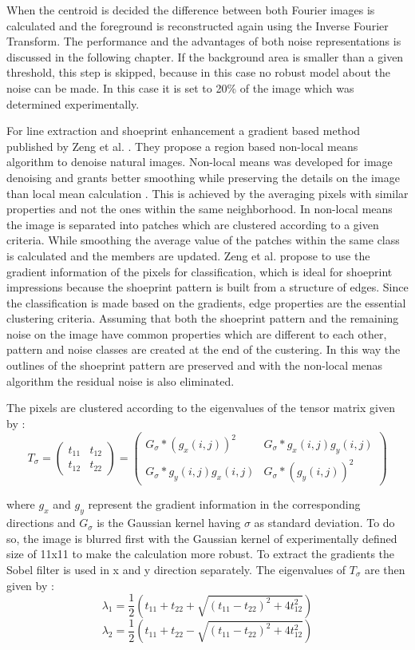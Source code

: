 \documentclass[draft,final]{vutinfth} %
\begin{document}
When the centroid is decided the difference between both Fourier images is calculated and the foreground is reconstructed again using the Inverse Fourier Transform.
The performance and the advantages of both noise representations is discussed in the following chapter.
If the background area is smaller than a given threshold, this step is skipped, because in this case no robust model about the noise can be made.
In this case it is set to 20\% of the image which was determined experimentally.
\par
For line extraction and shoeprint enhancement a gradient based method published by Zeng et al. \cite{zeng2011region}.
They propose a region based non-local means algorithm to denoise natural images.
Non-local means was developed for image denoising and grants better smoothing while preserving the details on the image than local mean calculation \cite{buades2005non}.
This is achieved by the averaging pixels with similar properties and not the ones within the same neighborhood.
In non-local means the image is separated into patches which are clustered according to a given criteria.
While smoothing the average value of the patches within the same class is calculated and the members are updated.
Zeng et al. \cite{zeng2011region} propose to use the gradient information of the pixels for classification, which is ideal for shoeprint impressions because the shoeprint pattern is built from a structure of edges.
Since the classification is made based on the gradients, edge properties are the essential clustering criteria.
Assuming that both the shoeprint pattern and the remaining noise on the image have common properties which are different to each other, pattern and noise classes are created at the end of the custering.
In this way the outlines of the shoeprint pattern are preserved and with the non-local menas algorithm the residual noise is also eliminated.
\par 
The pixels are clustered according to the eigenvalues of the tensor matrix given by \cite{zeng2011region}:
\[T_\sigma = 
\begin{pmatrix}
t_{11} & t_{12} \\
t_{12} & t_{22}
\end{pmatrix}
=
\begin{pmatrix}
G_\sigma*(g_x(i,j))^2 & G_{\sigma}*g_x(i, j)g_y(i, j)\\
G_{\sigma}*g_y(i, j)g_x(i, j) & G_{\sigma}*(g_y(i, j))^2
\end{pmatrix}
\]

where $g_x$ and $g_y$ represent the gradient information in the corresponding directions and $G_\sigma$ is the Gaussian kernel having $\sigma$ as standard deviation.
To do so, the image is blurred first with the Gaussian kernel of experimentally defined size of 11x11 to make the calculation more robust.
To extract the gradients the Sobel filter is used in x and y direction separately.
The eigenvalues of $T_\sigma$ are then given by \cite{zeng2011region}:
\[\lambda_1 = \frac{1}{2}(t_{11} + t_{22} + \sqrt{(t_{11}-t_{22})^2 + 4t_{12}^2})\]  
\[\lambda_2 = \frac{1}{2}(t_{11} + t_{22} - \sqrt{(t_{11}-t_{22})^2 + 4t_{12}^2})\]  
\label{eig}
\end{document}
